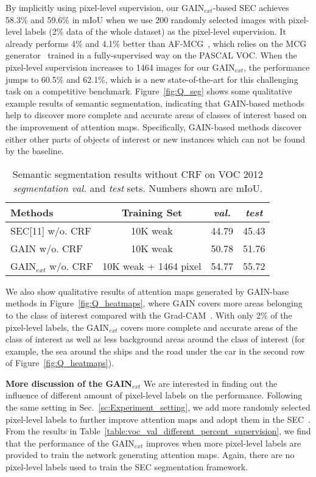 \documentclass[10pt,twocolumn,letterpaper]{article}
\begin{document}
By implicitly using pixel-level supervision, our GAIN$_{ext}$-based SEC achieves 58.3\% and 59.6\% in mIoU when we use 200 randomly selected images with pixel-level labels (2\% data of the whole dataset) as the pixel-level supervision. It already performs 4\% and 4.1\% better than AF-MCG~\cite{zhou2016learning}, which relies on the MCG generator~\cite{arbelaez2014multiscale} trained in a fully-supervised way on the PASCAL VOC. When the pixel-level supervision increases to 1464 images for our GAIN$_{ext}$, the performance jumps to 60.5\% and 62.1\%, which is a new state-of-the-art for this challenging task on a competitive benchmark. Figure~\ref{fig:Q_seg} shows some qualitative example results of semantic segmentation, indicating that GAIN-based methods help to discover more complete and accurate areas of classes of interest based on the improvement of attention maps. Specifically, GAIN-based methods discover either other parts of objects of interest or new instances which can not be found by the baseline.

\begin{table}
 \centering
 \begin{tabular}{lccc}
 \hline
 Methods & Training Set & \emph{val.}  &  \emph{test}\\
 \hline
 SEC[11] w/o. CRF & 10K weak & 44.79 & 45.43\\
 GAIN w/o. CRF & 10K weak  & 50.78 & 51.76\\
 GAIN$_{ext}$ w/o. CRF & 10K weak + 1464 pixel & 54.77 & 55.72\\
 \hline
 \end{tabular}
 \caption{Semantic segmentation results without CRF on VOC 2012 \textit{segmentation val.} and \textit{test} sets. Numbers shown are mIoU.}
 \label{table:voc_ablation_results}
 \end{table}

We also show qualitative results of attention maps generated by GAIN-base methods in Figure~\ref{fig:Q_heatmaps}, where GAIN covers more areas belonging to the class of interest compared with the Grad-CAM~\cite{grad-cam}. With only 2\% of the pixel-level labels, the GAIN$_{ext}$ covers more complete and accurate areas of the class of interest as well as less background areas around the class of interest (for example, the sea around the ships and the road under the car in the second row of Figure~\ref{fig:Q_heatmaps}). 



\textbf{More discussion of the GAIN$_{ext}$} We are interested in finding out the influence of different amount of pixel-level labels on the performance. Following the same setting in Sec.~\ref{sc:Experiment_setting}, we add more randomly selected pixel-level labels to further improve attention maps and adopt them in the SEC~\cite{kolesnikov2016seed}. From the results in Table~\ref{table:voc_val_different_percent_supervision}, we find that the performance of the GAIN$_{ext}$ improves when more pixel-level labels are provided to train the network generating attention maps. Again, there are no pixel-level labels used to train the SEC segmentation framework. 
\end{document}
